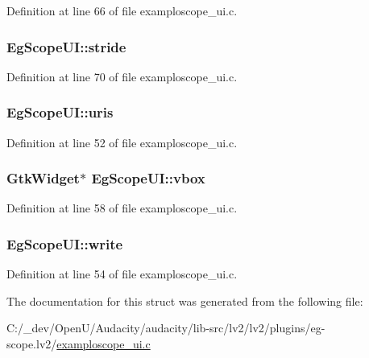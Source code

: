 Definition at line 66 of file examploscope\+\_\+ui.\+c.

\subsubsection[{\texorpdfstring{stride}{stride}}]{ Eg\+Scope\+U\+I\+::stride}\hypertarget{struct_eg_scope_u_i_a9cc245db681926f7cb67f28d5f92d8b8}{}\label{struct_eg_scope_u_i_a9cc245db681926f7cb67f28d5f92d8b8}


Definition at line 70 of file examploscope\+\_\+ui.\+c.

\subsubsection[{\texorpdfstring{uris}{uris}}]{ Eg\+Scope\+U\+I\+::uris}\hypertarget{struct_eg_scope_u_i_a0e56ac30eb210a280ea719659c59674c}{}\label{struct_eg_scope_u_i_a0e56ac30eb210a280ea719659c59674c}


Definition at line 52 of file examploscope\+\_\+ui.\+c.

\subsubsection[{\texorpdfstring{vbox}{vbox}}]{\setlength{\rightskip}{0pt plus 5cm}Gtk\+Widget$\ast$ Eg\+Scope\+U\+I\+::vbox}\hypertarget{struct_eg_scope_u_i_afe2aa5cca0531d988ac0b4b226deb317}{}\label{struct_eg_scope_u_i_afe2aa5cca0531d988ac0b4b226deb317}


Definition at line 58 of file examploscope\+\_\+ui.\+c.

\subsubsection[{\texorpdfstring{write}{write}}]{ Eg\+Scope\+U\+I\+::write}\hypertarget{struct_eg_scope_u_i_a4ab44dde19ac32296cdc4b9fe91d7450}{}\label{struct_eg_scope_u_i_a4ab44dde19ac32296cdc4b9fe91d7450}


Definition at line 54 of file examploscope\+\_\+ui.\+c.



The documentation for this struct was generated from the following file\+:\begin{DoxyCompactItemize}
\item 
C\+:/\+\_\+dev/\+Open\+U/\+Audacity/audacity/lib-\/src/lv2/lv2/plugins/eg-\/scope.\+lv2/\hyperlink{examploscope__ui_8c}{examploscope\+\_\+ui.\+c}\end{DoxyCompactItemize}
